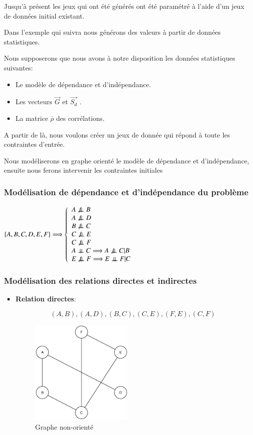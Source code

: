 \documentclass[a4paper]{article}
\begin{document}
\begin{appendices}
Jusqu'à présent les jeux qui ont été générés ont été paramétré à l'aide d'un jeux de données initial existant.

Dans l'exemple qui suivra nous générons des valeurs à partir de données statistiques.

Nous supposerons que nous avons à notre disposition les données statistiques suivantes:

\begin{itemize}


\item Le modèle de dépendance et d'indépendance. 
\item Les vecteurs $\vec{G}$ et $\vec{S_{d}}$ .
\item La matrice $\overline{{\rho}}$ des corrélations.
\end{itemize}
A partir de là, nous voulons créer un jeux de donnée qui répond à toute les contraintes d'entrée.

Nous modéliserons en graphe orienté le modèle de dépendance et d'indépendance, ensuite nous ferons intervenir les contraintes initiales  

\subsubsection{Modélisation de dépendance et d'indépendance du problème}
$\{ A,B,C,D,E,F \}\Longrightarrow\left\lbrace 
\begin{array}{lcl} 
A\not\ci B \\
A\not\ci D \\
B\not\ci C \\
C\not\ci E \\
C\not\ci F\\
A \ci C \Longrightarrow A\not\ci C |B\\
E\not\ci F\Longrightarrow E\ci F|C\\

\end{array}\right.$


\subsubsection{Modélisation des relations directes et indirectes}
\begin{itemize}
\item \textbf{Relation directes}:

$$(A,B),(A,D),(B,C),(C,E),(F,E),(C,F)$$
\begin{figure}[H] 
    \center 
    \includegraphics[width=5cm]{SKELETON_EX2_BUILD.eps} 
    \caption{Graphe non-orienté } 
\end{figure} 



\end{itemize}
\end{appendices}
\end{document}
